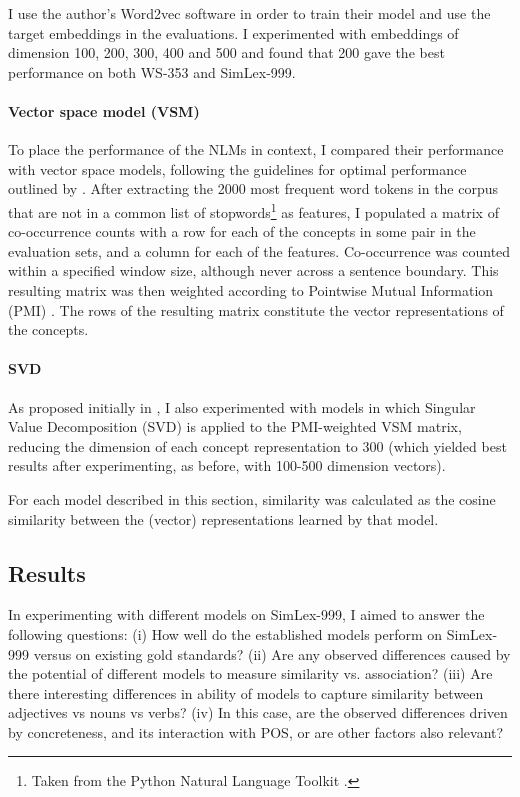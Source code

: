 I use the author's Word2vec software in order to train their model and use the target embeddings in the evaluations. I experimented with embeddings of dimension 100, 200, 300, 400 and 500 and found that 200 gave the best performance on both WS-353 and SimLex-999. 

\paragraph{\bf Vector space model (VSM)}

To place the performance of the NLMs in context, I compared their performance with vector space models, following the guidelines for optimal performance outlined by \cite{kiela2014systematic}. After extracting the 2000 most frequent word tokens in the corpus that are not in a common list of stopwords\footnote{Taken from the Python Natural Language Toolkit \cite{bird2006nltk}.} as features, I populated a matrix of co-occurrence counts with a row for each of the concepts in some pair in the evaluation sets, and a column for each of the features. Co-occurrence was counted within a specified window size, although never across a sentence boundary. This resulting matrix was then weighted according to Pointwise Mutual Information (PMI) \cite{recchia2009more}. The rows of the resulting matrix constitute the vector representations of the concepts.   

\paragraph{\bf SVD} As proposed initially in \cite{landauer1997solution}, I also experimented with models in which Singular Value Decomposition (SVD) \cite{golub1970singular} is applied to the PMI-weighted VSM matrix, reducing the dimension of each concept representation to 300 (which yielded best results after experimenting, as before, with 100-500 dimension vectors). 

\vspace{1\baselineskip}

\noindent 
For each model described in this section, similarity was calculated as the cosine similarity between the (vector) representations learned by that model. 

\subsection{Results}

In experimenting with different models on SimLex-999, I aimed to answer the following questions: (i) How well do the established models perform on SimLex-999 versus on existing gold standards? (ii) Are any observed differences caused by the potential of different models to measure similarity vs. association? (iii) Are there interesting differences in ability of models to capture similarity between adjectives vs nouns vs verbs? (iv) In this case, are the observed differences driven by concreteness, and its interaction with POS, or are other factors also relevant?

